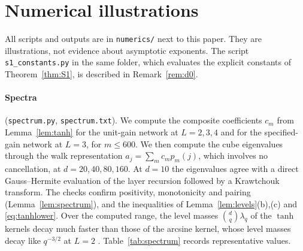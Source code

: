 \documentclass[11pt]{article}
\theoremstyle{definition}\newtheorem{assumption}[theorem]{Assumption}
\theoremstyle{remark}\newtheorem{remark}[theorem]{Remark}
\begin{document}
\section{Numerical illustrations}\label{sec:numerics}
All scripts and outputs are in \texttt{numerics/} next to this paper. They
are illustrations, not evidence about asymptotic exponents. The script
\texttt{s1\_constants.py} in the same folder, which evaluates the explicit
constants of Theorem~\ref{thm:S1}, is described in Remark~\ref{rem:d0}.

\paragraph{Spectra} (\texttt{spectrum.py}, \texttt{spectrum.txt}). We compute
the composite coefficients $c_m$ from Lemma~\ref{lem:tanh} for the unit-gain
network at $L=2,3,4$ and for the specified-gain network at $L=3$, for
$m\le600$. We then compute the cube eigenvalues through the walk
representation $a_j=\sum_mc_mp_m(j)$, which involves no cancellation, at
$d=20,40,80,160$. At $d=10$ the eigenvalues agree with a direct
Gauss--Hermite evaluation of the layer recursion followed by a Krawtchouk
transform. The checks confirm positivity, monotonicity and pairing
(Lemma~\ref{lem:spectrum}), and the inequalities of
Lemma~\ref{lem:levels}(b),(c) and \eqref{eq:tanhlower}. Over the computed
range, the level masses $\binom dq\lambda_q$ of the $\tanh$ kernels decay
much faster than those of the arcsine kernel, whose level masses decay like
$q^{-3/2}$ at $L=2$ \cite[Lemma~3.2]{subcritical}. Table~\ref{tab:spectrum} records representative values.


\end{document}
